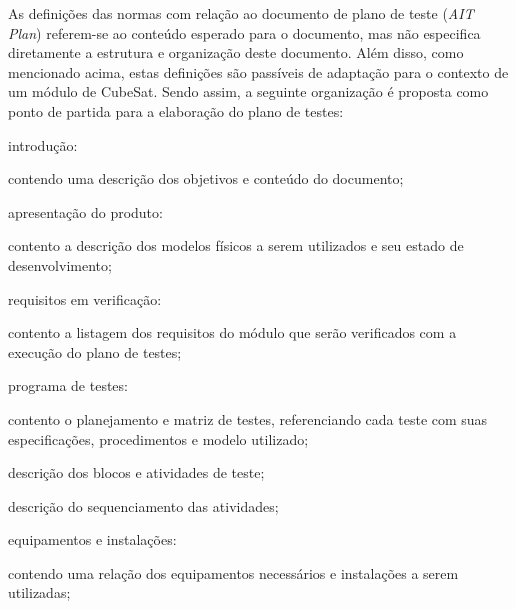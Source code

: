 As definições das normas com relação ao documento de plano de teste (\textit{AIT Plan}) referem-se ao conteúdo esperado para o documento, mas não especifica diretamente a estrutura e organização deste documento.
Além disso, como mencionado acima, estas definições são passíveis de adaptação para o contexto de um módulo de CubeSat.
Sendo assim, a seguinte organização é proposta como ponto de partida para a elaboração do plano de testes:

\begin{alineas}
    \item introdução:
    \begin{alineas}
        \item contendo uma descrição dos objetivos e conteúdo do documento;
    \end{alineas}

    \item apresentação do produto:
    \begin{alineas}
        \item contento a descrição dos modelos físicos a serem utilizados e seu estado de desenvolvimento;
    \end{alineas}

    \item requisitos em verificação:
    \begin{alineas}
        \item contento a listagem dos requisitos do módulo que serão verificados com a execução do plano de testes;
    \end{alineas}

    \item programa de testes:
    \begin{alineas}
        \item contento o planejamento e matriz de testes, referenciando cada teste com suas especificações, procedimentos e modelo utilizado;
        \item descrição dos blocos e atividades de teste;
        \item descrição do sequenciamento das atividades;
    \end{alineas}

    \item equipamentos e instalações:
    \begin{alineas}
        \item contendo uma relação dos equipamentos necessários e instalações a serem utilizadas;
    \end{alineas}


\end{alineas}
